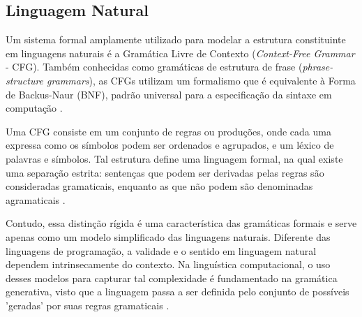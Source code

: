 \documentclass[
    12pt,                %
    openright,           %
    oneside,             %
    a4paper,             %
    english,             %
    brazil               %
]{abntex2}
\begin{document}
\subsection{Linguagem Natural}
\label{subsec:linguagemnatural}
\par
Um sistema formal amplamente utilizado para modelar a estrutura constituinte em linguagens naturais é a Gramática Livre de Contexto (\textit{Context-Free Grammar} - CFG). 
Também conhecidas como gramáticas de estrutura de frase (\textit{phrase-structure grammars}), as CFGs utilizam um formalismo que é equivalente à Forma de Backus-Naur (BNF), padrão universal para a especificação da sintaxe em computação \cite{jurafsky2026speech}.
\par
Uma CFG consiste em um conjunto de regras ou produções, onde cada uma expressa como os símbolos podem ser ordenados e agrupados, e um léxico de palavras e símbolos.
Tal estrutura define uma linguagem formal, na qual existe uma separação estrita: sentenças que podem ser derivadas pelas regras são consideradas gramaticais, enquanto as que não podem são denominadas agramaticais \cite{jurafsky2026speech}.
\par
Contudo, essa distinção rígida é uma característica das gramáticas formais e serve apenas como um modelo simplificado das linguagens naturais.
Diferente das linguagens de programação, a validade e o sentido em linguagem natural dependem intrinsecamente do contexto.
Na linguística computacional, o uso desses modelos para capturar tal complexidade é fundamentado na gramática generativa, visto que a linguagem passa a ser definida pelo conjunto de possíveis 'geradas' por suas regras gramaticais \cite{jurafsky2026speech}.
\end{document}
